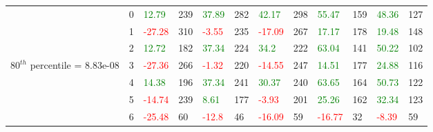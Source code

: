 \begin{table}[htb!]
\begin{adjustwidth}{-0.9in}{-0.9in}
\begin{tabular}{|p{5em}|p{2em}|p{3em}|p{3em}|p{3em}|p{3em}|p{3em}|p{3em}|p{3em}|p{3em}|p{3em}|p{3em}|}
            & 0 & \textcolor{green}{12.79} & 239 & \textcolor{green}{37.89} & 282 & \textcolor{green}{42.17} & 298 & \textcolor{green}{55.47} & 159 & \textcolor{green}{48.36} & 127\\\cline{3-12}
            & 1 & \textcolor{red}{-27.28} & 310 & \textcolor{red}{-3.55} & 235 & \textcolor{red}{-17.09} & 267 & \textcolor{green}{17.17} & 178 & \textcolor{green}{19.48} & 148\\\cline{3-12}
            & 2 & \textcolor{green}{12.72} & 182 & \textcolor{green}{37.34} & 224 & \textcolor{green}{34.2} & 222 & \textcolor{green}{63.04} & 141 & \textcolor{green}{50.22} & 102\\\cline{3-12}
            $80^{th}$ percentile = 8.83e-08 & 3 & \textcolor{red}{-27.36} & 266 & \textcolor{red}{-1.32} & 220 & \textcolor{red}{-14.55} & 247 & \textcolor{green}{14.51} & 177 & \textcolor{green}{24.88} & 116\\[-5.5ex]\cline{3-12}
            & 4 & \textcolor{green}{14.38} & 196 & \textcolor{green}{37.34} & 241 & \textcolor{green}{30.37} & 240 & \textcolor{green}{63.65} & 164 & \textcolor{green}{50.73} & 122\\\cline{3-12}
            & 5 & \textcolor{red}{-14.74} & 239 & \textcolor{green}{8.61} & 177 & \textcolor{red}{-3.93} & 201 & \textcolor{green}{25.26} & 162 & \textcolor{green}{32.34} & 123\\\cline{3-12}
            & 6 & \textcolor{red}{-25.48} & 60 & \textcolor{red}{-12.8} & 46 & \textcolor{red}{-16.09} & 59 & \textcolor{red}{-16.77} & 32 & \textcolor{red}{-8.39} & 59\\\hline\hline


\end{tabular}
\end{adjustwidth}
\end{table}
